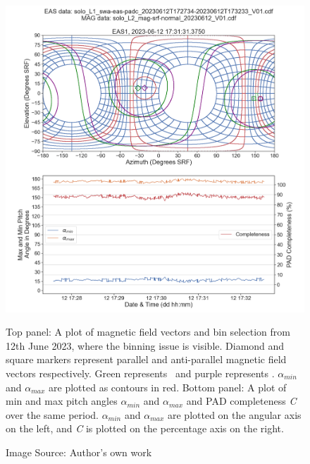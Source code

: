 \begin{figure}[h!]
    \centering
    \centerfloat
    \includegraphics[width=1.2\linewidth]{figures/Verbose Example 12062023 Real.png}
    \caption{Top panel: A plot of magnetic field vectors and bin selection from 12th June 2023, where the binning issue is visible. Diamond and square markers represent parallel and anti-parallel magnetic field vectors respectively. Green represents \Beas\ and purple represents \Bmag. \(\alpha_{min}\) and \(\alpha_{max}\) are plotted as contours in red. Bottom panel: A plot of min and max pitch angles \(\alpha_{min}\) and \(\alpha_{max}\) and PAD completeness \textit{C} over the same period. \(\alpha_{min}\) and \(\alpha_{max}\) are plotted on the angular axis on the left, and \textit{C} is plotted on the percentage axis on the right.}
    \caption*{Image Source: Author's own work}
    \label{fig: full contours + REAL selection + loss}
\end{figure}

